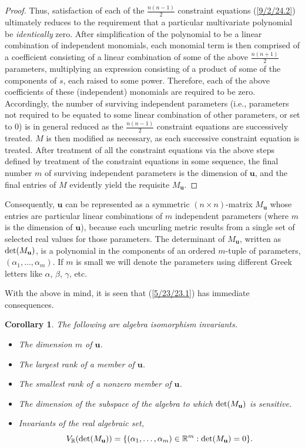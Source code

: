 \documentclass{amsart}
\numberwithin{equation}{section}
\newtheorem{corollary}[theorem]{Corollary}
\theoremstyle{definition}
\numberwithin{theorem}{section}
\begin{document}
\begin{proof}
Thus, satisfaction of each of the $\frac{n(n-1)}{2}$ constraint equations (\ref{9/2/24.2}) ultimately reduces to the requirement that a particular multivariate polynomial be {\it identically} zero.  After simplification of the polynomial to be a linear combination of independent monomials, each monomial term is then comprised of a coefficient consisting of a linear combination of some of the above $\frac{n(n+1)}{2}$ parameters, multiplying an expression consisting of a product of some of the components of $s$, each raised to some power.  Therefore, each of the above coefficients of these (independent) monomials are required to be zero.  Accordingly, the number of surviving independent parameters (i.e., parameters not required to be equated to some linear combination of other parameters, or set to 0) is in general reduced as the $\frac{n(n-1)}{2}$ constraint equations are successively treated.  $M$ is then modified as necessary, as each successive constraint equation is treated.  After treatment of all the constraint equations via the above steps defined by treatment of the constraint equations in some sequence, the final number $m$ of surviving independent parameters is the dimension of $\mathbf{u}$, and the final entries of $M$ evidently yield the requisite $M_\mathbf{u}$.
\end{proof}

Consequently, $\mathbf{u}$ can be represented as a symmetric $(n\times n)$-matrix $M_{\mathbf{u}}$ whose entries are particular linear combinations of $m$ independent parameters (where $m$ is the dimension of $\mathbf{u}$), because each uncurling metric results from a single set of selected real values for those parameters.  The determinant of $M_{\mathbf{u}}$, written as ${\rm det}(M_{\mathbf{u}})$, is a polynomial in the components of an ordered $m$-tuple of parameters, $(\alpha_1,\dots,\alpha_m)$.  If $m$ is small  we will denote the parameters using different Greek letters like $\alpha$, $\beta$, $\gamma$, etc. 

\bigskip

   With the above in mind, it is seen that (\ref{5/23/23.1}) has immediate consequences. 
                 
  \begin{corollary}\label{8/18/23.2} The following are algebra isomorphism invariants. \begin{itemize} \item The dimension $m$ of $\mathbf{u}$.   \item The largest rank  of a member of $\mathbf{u}$.  \item The smallest rank of a nonzero member of $\mathbf{u}$. \item The dimension of the subspace of the algebra to which ${\rm det}(M_{\mathbf{u}})$ is sensitive. \item Invariants of the real algebraic set, \[V_\mathbb{R}({\rm det}(M_{\mathbf{u}})) = \{(\alpha_1,\dots,\alpha_m)\in\mathbb{R}^m: {\rm det}(M_{\mathbf{u}}) = 0 \}.\] \end{itemize} \end{corollary}
  
\end{document}
